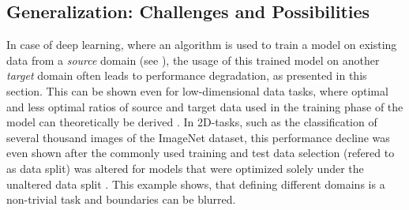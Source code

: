 
    \subsection{Generalization: Challenges and Possibilities} %
        In case of deep learning, where an algorithm is used to train a model on existing data from a \emph{source} domain (see ), the usage of this trained model on another \emph{target} domain often leads to performance degradation, as presented in this section.
        This can be shown even for low-dimensional data tasks, where optimal and less optimal ratios of source and target data used in the training phase of the model can theoretically be derived \citep{ben2010theory}.
        In \ac{2D}-tasks, such as the classification of several thousand images of the ImageNet dataset, this performance decline was even shown after the commonly used training and test data selection (refered to as data split) was altered for models that were optimized solely under the unaltered data split \citep{recht2019imagenet}. This example shows, that defining different domains is a non-trivial task and boundaries can be blurred.

